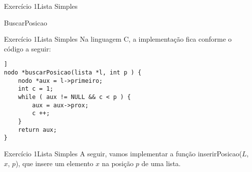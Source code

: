 \documentclass[aspectratio=169]{beamer}
\begin{document}
\begin{frame}[fragile]{Exercício 1}{Lista Simples}
\begin{algorithm}[H]
\caption{BuscarPosicao} 
\label{ListaSimplesBuscar}
\end{algorithm}
\end{frame}


\begin{frame}[fragile]{Exercício 1}{Lista Simples}
Na linguagem C, a implementação fica conforme o código a seguir:
\begin{lstlisting}[style=CStyle]]
nodo *buscarPosicao(lista *l, int p ) {
    nodo *aux = l->primeiro;
    int c = 1;
    while ( aux != NULL && c < p ) {
        aux = aux->prox;
        c ++;
    }
    return aux;
}
\end{lstlisting}  
\end{frame}


\begin{frame}[fragile]{Exercício 1}{Lista Simples}
A seguir, vamos implementar a função inserirPosicao($L$, $x$, $p$), que insere um elemento $x$ na posição $p$ de uma lista.
\end{frame}

\end{document}
